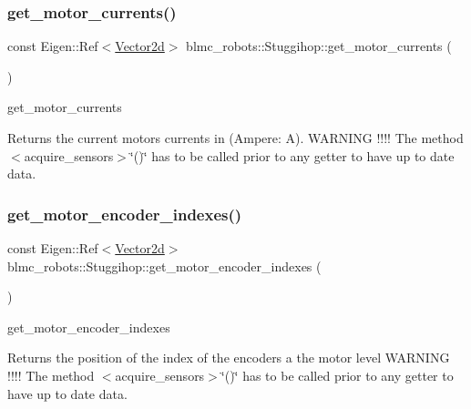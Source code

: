\subsubsection{\texorpdfstring{get\+\_\+motor\+\_\+currents()}{get\_motor\_currents()}}
{\footnotesize\ttfamily const Eigen\+::\+Ref$<$\hyperlink{common__header_8hpp_acb6916bc8c9fe9d98c484fd4cc201447}{Vector2d}$>$ blmc\+\_\+robots\+::\+Stuggihop\+::get\+\_\+motor\+\_\+currents (\begin{DoxyParamCaption}{ }\end{DoxyParamCaption})\hspace{0.3cm}{\ttfamily [inline]}}



get\+\_\+motor\+\_\+currents 

\begin{DoxyReturn}{Returns}
the current motors currents in (Ampere\+: A). W\+A\+R\+N\+I\+NG !!!! The method $<$acquire\+\_\+sensors$>$\char`\"{}()\char`\"{} has to be called prior to any getter to have up to date data. 
\end{DoxyReturn}
\mbox{\label{classblmc__robots_1_1Stuggihop_a41fda0b6e5b070341e342291c1d0fd1d}} 
\subsubsection{\texorpdfstring{get\+\_\+motor\+\_\+encoder\+\_\+indexes()}{get\_motor\_encoder\_indexes()}}
{\footnotesize\ttfamily const Eigen\+::\+Ref$<$\hyperlink{common__header_8hpp_acb6916bc8c9fe9d98c484fd4cc201447}{Vector2d}$>$ blmc\+\_\+robots\+::\+Stuggihop\+::get\+\_\+motor\+\_\+encoder\+\_\+indexes (\begin{DoxyParamCaption}{ }\end{DoxyParamCaption})\hspace{0.3cm}{\ttfamily [inline]}}



get\+\_\+motor\+\_\+encoder\+\_\+indexes 

\begin{DoxyReturn}{Returns}
the position of the index of the encoders a the motor level W\+A\+R\+N\+I\+NG !!!! The method $<$acquire\+\_\+sensors$>$\char`\"{}()\char`\"{} has to be called prior to any getter to have up to date data. 
\end{DoxyReturn}
\mbox{\label{classblmc__robots_1_1Stuggihop_acffc9bf97d4b58ad49703855a70b95cf}} 
